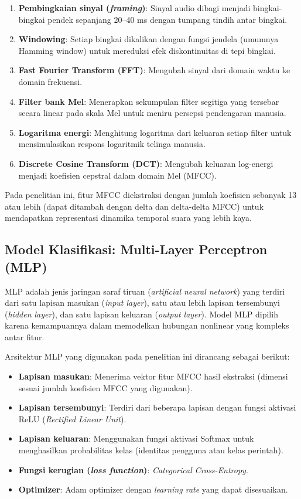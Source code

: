 \begin{enumerate}
    \item \textbf{Pembingkaian sinyal (\textit{framing})}: Sinyal audio dibagi menjadi bingkai-bingkai pendek sepanjang 20--40 ms dengan tumpang tindih antar bingkai.
    \item \textbf{Windowing}: Setiap bingkai dikalikan dengan fungsi jendela (umumnya Hamming window) untuk mereduksi efek diskontinuitas di tepi bingkai.
    \item \textbf{Fast Fourier Transform (FFT)}: Mengubah sinyal dari domain waktu ke domain frekuensi.
    \item \textbf{Filter bank Mel}: Menerapkan sekumpulan filter segitiga yang tersebar secara linear pada skala Mel untuk meniru persepsi pendengaran manusia.
    \item \textbf{Logaritma energi}: Menghitung logaritma dari keluaran setiap filter untuk mensimulasikan respons logaritmik telinga manusia.
    \item \textbf{Discrete Cosine Transform (DCT)}: Mengubah keluaran log-energi menjadi koefisien cepstral dalam domain Mel (MFCC).
\end{enumerate}

Pada penelitian ini, fitur MFCC diekstraksi dengan jumlah koefisien sebanyak 13 atau lebih (dapat ditambah dengan delta dan delta-delta MFCC) untuk mendapatkan representasi dinamika temporal suara yang lebih kaya.

\subsection*{Model Klasifikasi: Multi-Layer Perceptron (MLP)}

MLP adalah jenis jaringan saraf tiruan (\textit{artificial neural network}) yang terdiri dari satu lapisan masukan (\textit{input layer}), satu atau lebih lapisan tersembunyi (\textit{hidden layer}), dan satu lapisan keluaran (\textit{output layer}). Model MLP dipilih karena kemampuannya dalam memodelkan hubungan nonlinear yang kompleks antar fitur.

Arsitektur MLP yang digunakan pada penelitian ini dirancang sebagai berikut:
\begin{itemize}
    \item \textbf{Lapisan masukan}: Menerima vektor fitur MFCC hasil ekstraksi (dimensi sesuai jumlah koefisien MFCC yang digunakan).
    \item \textbf{Lapisan tersembunyi}: Terdiri dari beberapa lapisan dengan fungsi aktivasi ReLU (\textit{Rectified Linear Unit}).
    \item \textbf{Lapisan keluaran}: Menggunakan fungsi aktivasi Softmax untuk menghasilkan probabilitas kelas (identitas pengguna atau kelas perintah).
    \item \textbf{Fungsi kerugian (\textit{loss function})}: \textit{Categorical Cross-Entropy}.
    \item \textbf{Optimizer}: Adam optimizer dengan \textit{learning rate} yang dapat disesuaikan.
\end{itemize}


